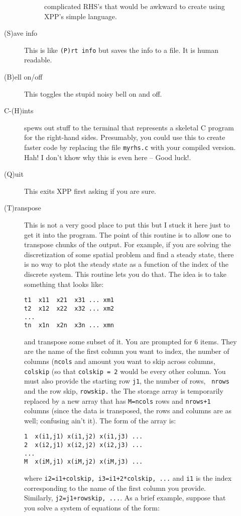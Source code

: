 \documentclass{article}
\begin{document}
\begin{description}
\begin{description}
\begin{description}
complicated RHS's that would be awkward to create using XPP's simple
language. 
\end{description}
\item[(S)ave info] This is like {\tt (P)rt info} but saves the info to
a file.  It is human readable.
\item[(B)ell on/off]  This toggles the stupid noisy bell on and off.
\item[C-(H)ints] spews out stuff to the terminal that represents a
skeletal C program for the right-hand sides.  Presumably, you could
use this to create faster code by replacing the file {\tt myrhs.c}
with your compiled version. Hah! I don't khow why this is even here --
Good luck!. 
\item[(Q)uit]  This exits XPP first asking if you are sure.
\item[ (T)ranspose ]  This is not a very good place to put this but I
stuck it here just to get it into the program.  The point of this
routine is to allow one to transpose chunks of the output.  For
example, if you are solving the discretization of some spatial problem
and find a steady state, there is no way to plot the steady state as a
function of the index of the discrete system.  This routine lets you
do that.  The idea is to take something that looks like:
\begin{verbatim}
t1  x11  x21  x31 ... xm1 
t2  x12  x22  x32 ... xm2
...
tn  x1n  x2n  x3n ... xmn
\end{verbatim}
and transpose some subset of it. You are prompted for 6 items.  They
are the name of the first column you want to index, the number of
columns ({\tt ncols} and amount you want to skip across columns, {\tt
colskip} (so that {\tt colskip = 2} would be every other column.  You
must also provide the starting row {\tt j1}, the number of rows, {\tt
nrows} and the row skip, {\tt rowskip.} the The storage array is temporarily
replaced by a new array that has {\tt M=ncols} rows and {\tt nrows+1}
columns (since the data is transposed, the rows and columns are as
well; confusing ain't it).  The form of the array is:
\begin{verbatim}
1  x(i1,j1) x(i1,j2) x(i1,j3) ...
2  x(i2,j1) x(i2,j2) x(i2,j3) ...
...
M  x(iM,j1) x(iM,j2) x(iM,j3) ...
\end{verbatim}
where {\tt i2=i1+colskip, i3=i1+2*colskip, ...} and {\tt i1} is the
index corresponding to the name of the first column you
provide. Similarly, {\tt j2=j1+rowskip, ...}. As a brief example,
suppose that you solve a system of equations of the form:
\[
\]
\end{description}
\end{description}
\end{document}
